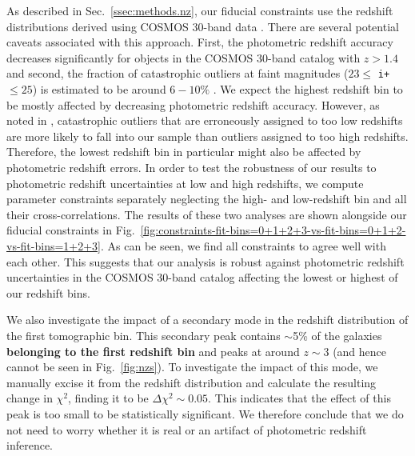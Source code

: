 \documentclass[a4paper,11pt]{article}
\newcommand{\rev}[1]{{\textbf{#1}}}
\begin{document}
      As described in Sec.~\ref{ssec:methods.nz}, our fiducial constraints use the redshift distributions derived using COSMOS 30-band data \cite{2016ApJS..224...24L}. There are several potential caveats associated with this approach. First, the   photometric redshift accuracy decreases significantly for objects in the COSMOS 30-band catalog with $z > 1.4$ and second, the fraction of catastrophic outliers at faint magnitudes ($23 \leq$ \texttt{i+} $\leq 25$) is estimated to be around $6-10 \%$ \cite{2016ApJS..224...24L}. We expect the highest redshift bin to be mostly affected by decreasing photometric redshift accuracy. However, as noted in \cite{Joudaki:2019}, catastrophic outliers that are erroneously assigned to too low redshifts are more likely to fall into our sample than outliers assigned to too high redshifts. Therefore, the lowest redshift bin in particular might also be affected by photometric redshift errors. In order to test the robustness of our results to photometric redshift uncertainties at low and high redshifts, we compute parameter constraints separately neglecting the high- and low-redshift bin and all their cross-correlations. The results of these two analyses are shown alongside our fiducial constraints in Fig.~\ref{fig:constraints-fit-bins=0+1+2+3-vs-fit-bins=0+1+2-vs-fit-bins=1+2+3}. As can be seen, we find all constraints to agree well with each other. This suggests that our analysis is robust against photometric redshift uncertainties in the COSMOS 30-band catalog affecting the lowest or highest of our redshift bins. 

      We also investigate the impact of a secondary mode in the redshift distribution of the first tomographic bin. This secondary peak contains $\sim$5\% of the galaxies \rev{belonging to the first redshift bin} and peaks at around $z\sim 3$ (and hence cannot be seen in Fig.~\ref{fig:nzs}). To investigate the impact of this mode, we manually excise it from the redshift distribution and calculate the resulting change in $\chi^2$, finding it to be $\Delta \chi^2\sim 0.05$. This indicates that the effect of this peak is too small to be statistically significant. We therefore conclude that we do not need to worry whether it is real or an artifact of photometric redshift inference. 
\end{document}
